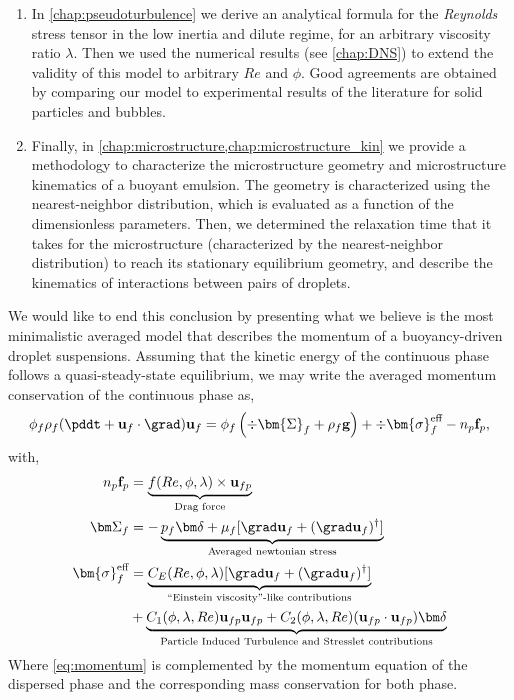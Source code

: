 \begin{enumerate}
    \item In \ref{chap:pseudoturbulence} we derive an analytical formula for the \textit{Reynolds} stress tensor in the low inertia and dilute regime, for an arbitrary viscosity ratio $\lambda$. 
    Then we used the numerical results (see \ref{chap:DNS}) to extend the validity of this model to arbitrary $Re$ and $\phi$. 
    Good agreements are obtained by comparing our model to experimental results of the literature for solid particles and bubbles.  
    \item Finally, in \ref{chap:microstructure,chap:microstructure_kin} we provide a methodology to characterize the microstructure geometry and microstructure kinematics of a buoyant emulsion. 
    The geometry is characterized using the nearest-neighbor distribution, which is evaluated as a function of the dimensionless parameters. 
    Then, we determined the relaxation time that it takes for the microstructure (characterized by the nearest-neighbor distribution) to reach its stationary equilibrium geometry, and describe the kinematics of interactions between pairs of droplets. 
\end{enumerate}

We would like to end this conclusion by presenting what we believe is the most minimalistic averaged model that describes the momentum of a buoyancy-driven droplet suspensions. 
Assuming that the kinetic energy of the continuous phase follows a quasi-steady-state equilibrium, we may write the averaged momentum conservation of the continuous phase as, 
\begin{align}
    \phi_f\rho_f (\pddt + \textbf{u}_f\cdot \grad)\textbf{u}_f
    = \phi_f 
    \left(\div \bm{\Sigma}_f
    + \rho_f \textbf{g}\right)
    + \div  \bm{\sigma}_f^{\text{eff}}
    - n_p \textbf{f}_p,
    \label{eq:momentum}
\end{align}
with, 
\begin{align}
    n_p \textbf{f}_p  
    &= 
    \underbrace{f(Re,\phi, \lambda) \times \textbf{u}_{fp}}_\text{Drag force}
    \label{eq:draggggg}
    \\
    \label{eq:newtonian}
  \bm\Sigma_f &= - \underbrace{p_f \bm\delta + \mu_f [\grad \textbf{u}_f +  (\grad \textbf{u}_f)^\dagger ]}_\text{Averaged newtonian stress} 
  \\
    \bm{\sigma}^{\text{eff}}_f 
    &= \underbrace{ C_E(Re,\phi,\lambda)  [\grad \textbf{u}_f +  (\grad \textbf{u}_f)^\dagger ] }_\text{``Einstein viscosity''-like contributions}
    \nonumber\\
    &+ 
    \underbrace{
      C_1(\phi,\lambda,Re)\textbf{u}_{fp}\textbf{u}_{fp}
      +  C_2(\phi,\lambda,Re)(\textbf{u}_{fp}\cdot \textbf{u}_{fp})     \bm\delta}_\text{Particle Induced Turbulence and Stresslet contributions}
    \label{eq:stress}
\end{align}
Where \ref{eq:momentum} is complemented by the momentum equation of the dispersed phase and the corresponding mass conservation for both phase. 

